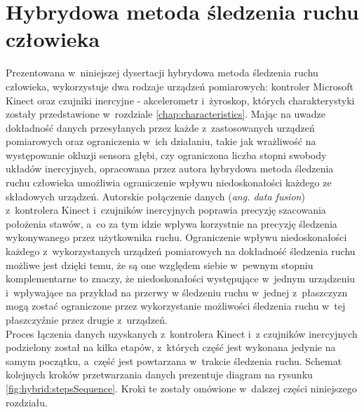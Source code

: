 \chapter{Hybrydowa metoda śledzenia ruchu człowieka}\label{chap:hybrid}

Prezentowana w~niniejszej dysertacji hybrydowa metoda śledzenia ruchu człowieka, wykorzystuje dwa rodzaje urządzeń pomiarowych: kontroler Microsoft Kinect oraz czujniki inercyjne - akcelerometr i~żyroskop, których charakterystyki zostały przedstawione w~rozdziale \ref{chap:characteristics}. Mając na uwadze dokładność danych przesyłanych przez każde z~zastosowanych urządzeń pomiarowych oraz ograniczenia w~ich działaniu, takie jak wrażliwość na występowanie okluzji sensora głębi, czy ograniczona liczba stopni swobody układów inercyjnych, opracowana przez autora hybrydowa metoda śledzenia ruchu człowieka umożliwia ograniczenie wpływu niedoskonałości każdego ze składowych urządzeń. Autorskie połączenie danych (\emph{ang. data fusion}) z~kontrolera Kinect i~czujników inercyjnych poprawia precyzję szacowania położenia stawów, a~co za tym idzie wpływa korzystnie na precyzję śledzenia wykonywanego przez użytkownika ruchu. Ograniczenie wpływu niedoskonałości każdego z~wykorzystanych urządzeń pomiarowych na dokładność śledzenia ruchu możliwe jest dzięki temu, że są one względem siebie w~pewnym stopniu komplementarne to znaczy, że niedoskonałości występujące w~jednym urządzeniu i~wpływające na przykład na przerwy w śledzeniu ruchu w~jednej z~płaszczyzn mogą zostać ograniczone przez wykorzystanie możliwości śledzenia ruchu w~tej płaszczyźnie przez drugie z~urządzeń.\\
Proces łączenia danych uzyskanych z~kontrolera Kinect i~z czujników inercyjnych podzielony został na kilka etapów, z~których część jest wykonana jedynie na samym początku, a~część jest powtarzana w~trakcie śledzenia ruchu. Schemat kolejnych kroków przetwarzania danych prezentuje diagram na rysunku \ref{fig:hybrid:stepsSequence}. Kroki te zostały omówione w~dalszej części niniejszego rozdziału.\\

